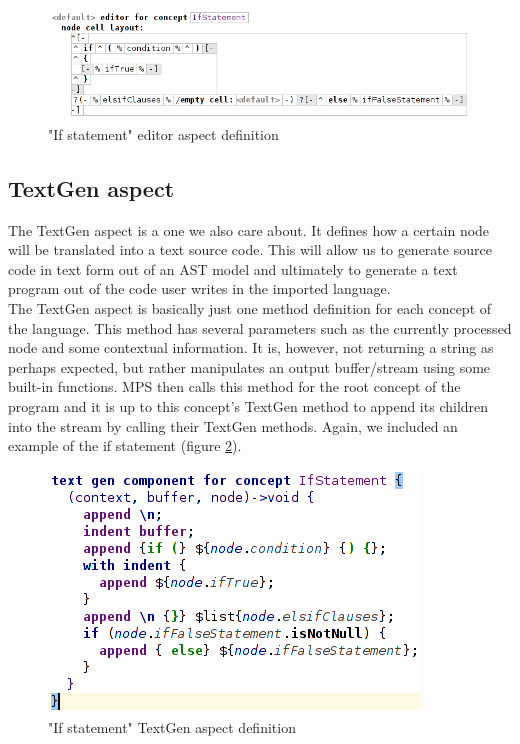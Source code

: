 \begin{figure}[h]
	\centering
	\includegraphics[width=\textwidth]{./img/if_statement_editor_definition.png}
	\caption{"If statement" editor aspect definition}
	\label{fig:if_editor_definition}
\end{figure}

\subsection{TextGen aspect}
The TextGen aspect is a one we also care about. It defines how a certain node will be translated into a text source code. This will allow us to generate source code in text form out of an AST model and ultimately to generate a text program out of the code user writes in the imported language. 
\\

The TextGen aspect is basically just one method definition for each concept of the language. This method has several parameters such as the currently processed node and some contextual information. It is, however, not returning a string as perhaps expected, but rather manipulates an output buffer/stream using some built-in functions. MPS then calls this method for the root concept of the program and it is up to this concept's TextGen method to append its children into the stream by calling their TextGen methods. Again, we included an example of the if statement (figure \ref{fig:if_statement_textgen}).

\begin{figure}[h]
	\centering
	\includegraphics[scale=0.70]{./img/if_statement_textgen.png}
	\caption{"If statement" TextGen aspect definition}
	\label{fig:if_statement_textgen}
\end{figure}


